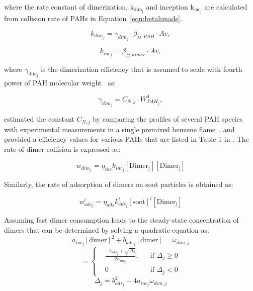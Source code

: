\noindent where the rate constant of dimerization, $\mathrm{k_{dim_{j}}}$ and inception $\mathrm{k_{inc_{j}}}$ are calculated from collision rate of PAHs in Equation~\eqref{eqn:betahmads}.

\begin{equation}
	k_{dim_{j}}=
	\gamma_{dim_j}\cdot\beta_{jj,PAH}\cdot Av
	\label{eqn:kdim_dimcoal},
\end{equation}

\begin{equation}
	k_{inc_{j}}=
	\beta_{jj,dimer}\cdot Av
	\label{eqn:kinc_dimcoal},
\end{equation}

\noindent where $\mathrm{\gamma_{dim_j}}$ is the dimerization efficiency that is assumed to scale with fourth power of PAH molecular weight~\cite{blanquart2009analyzing} as:

\begin{equation}
	\gamma_{dim_j}=
	C_{N,j}\cdot W_{PAH_j}^4
	\label{eqn:gamma_dimcoal},
\end{equation} 

\citet{blanquart2009joint} estimated the constant ${C_{N,j}}$ by comparing the profiles of several PAH species with experimental measurements in a single premixed benzene flame~\citep{tregrossi1999combustion}, and provided a efficiency values for various PAHs that are listed in Table 1 in \citep{blanquart2009analyzing}. The rate of dimer collision is expressed as:

\begin{equation}
	w_{dim_j} = \eta_{inc} k_{inc_{j}} [\mathrm{Dimer_j}] [\mathrm{Dimer_j}]
	\label{eqn:wdim_dimcoal}
\end{equation}

Similarly, the rate of adsorption of dimers on soot particles is obtained as:

\begin{equation}
	w^i_{ads_j} = \eta_{ads} k^i_{ads_{j}} [\mathrm{soot}]^i [\mathrm{Dimer_j}]
\end{equation}

Assuming fast dimer consumption leads to the steady-state concentration of dimers that can be determined by solving a quadratic equation as:
\begin{equation}
	a_{inc_j}[\mathrm{dimer}]^2+b_{ads_j}[\mathrm{dimer}]=\omega_{dim,j}
	\label{eqn:quad_dimcoal}
\end{equation}
\begin{equation}
	[\mathrm{Dimer_j}]=
	\left\{
	\begin{aligned}
		&\frac{-b_{ads_j}+\sqrt{\Delta_j}}{2a_{inc_j}},
		&&
		\text{if } \Delta_j \ge 0
		\\
		& 0 
		&&
		\text{if } \Delta_j < 0
	\end{aligned}
	\right.
	\label{eqn:dimer_dimcoal}
\end{equation}
\begin{equation}
	\Delta_j = b_{ads_j}^2-4a_{inc_j}\omega_{dim,j}
	\label{eqn:delta_dimcoal}
\end{equation}

